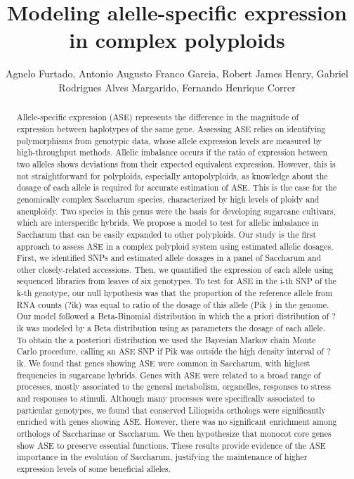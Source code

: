 \documentclass[twoside]{article}
\title{\vspace{-15mm}\fontsize{24pt}{10pt}\selectfont\textbf{ Modeling alelle-specific expression in complex polyploids }} %
\author{ Agnelo Furtado,  Antonio Augusto Franco Garcia,  Robert James Henry,  Gabriel Rodrigues Alves Margarido,  Fernando Henrique Correr }
\affil{ Escola Superior de Agricultura "Luiz de Queiroz" / Universidade de S\~ao Paulo (ESALQ/USP) }
\date{}
\begin{document}
  
  
  \maketitle %
  
  
  \thispagestyle{fancy} %
  
  
  \begin{abstract}
  Allele-specific expression (ASE) represents the difference in the magnitude of expression between  haplotypes of the same gene. Assessing ASE relies on identifying polymorphisms from genotypic data,  whose allele expression levels are measured by high-throughput methods. Allelic imbalance occurs if the ratio of expression between two alleles shows deviations from their expected equivalent expression. However,  this is not straightforward for polyploids,  especially autopolyploids,  as knowledge about the dosage of each allele is required for accurate estimation of ASE. This is the case for the genomically complex Saccharum species,  characterized by high levels of ploidy and aneuploidy. Two species in this genus were the basis for developing sugarcane cultivars,  which are interspecific hybrids. We propose a model to test for allelic imbalance in Saccharum that can be easily expanded to other polyploids. Our study is the first approach to assess ASE in a complex polyploid system using estimated allelic dosages. First,  we identified SNPs and estimated allele dosages in a panel of Saccharum and other closely-related accessions. Then,  we quantified the expression of each allele using sequenced libraries from leaves of six genotypes. To test for ASE in the i-th SNP of the k-th genotype,  our null hypothesis was that the proportion of the reference allele from RNA counts (?ik) was equal to ratio of the dosage of this allele (Pik ) in the genome.  Our model followed a Beta-Binomial distribution in which the a priori distribution of ?ik was modeled by a Beta distribution using as parameters the dosage of each allele. To obtain the a posteriori distribution we used the Bayesian Markov chain Monte Carlo procedure,  calling an ASE SNP if Pik  was outside the high density interval of ?ik. We found that genes showing ASE were common in Saccharum,  with highest frequencies in sugarcane hybrids. Genes with ASE were related to a broad range of processes,  mostly associated to the general metabolism,  organelles,  responses to stress and responses to stimuli. Although many processes were specifically associated to particular genotypes,  we found that conserved Liliopsida orthologs were significantly enriched with genes showing ASE. However,  there was no significant enrichment among orthologs of Saccharinae or Saccharum. We then hypothesize that monocot core genes show ASE to preserve essential functions. These results provide evidence of the ASE importance in the evolution of Saccharum,  justifying the maintenance of higher expression levels of some beneficial alleles.
  

\end{abstract}
\end{document}
